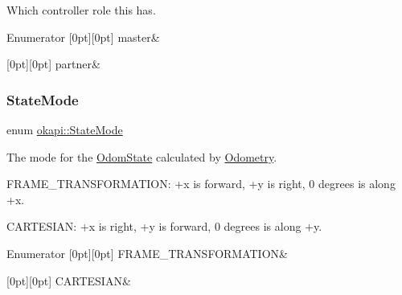 Which controller role this has. \begin{DoxyEnumFields}{Enumerator}
[0pt][0pt]{}\mbox{\label{namespaceokapi_a56349a0562b06c6ffc742e94cb1e4361aeb0a191797624dd3a48fa681d3061212}} 
master&\\
\hline

[0pt][0pt]{}\mbox{\label{namespaceokapi_a56349a0562b06c6ffc742e94cb1e4361a7454739e907f5595ae61d84b8547f574}} 
partner&\\
\hline

\end{DoxyEnumFields}
\mbox{\label{namespaceokapi_af37fbd761bd859a00ff4dd4a87dd8c07}} 
\subsubsection{\texorpdfstring{StateMode}{StateMode}}
{\footnotesize\ttfamily enum \mbox{\hyperlink{namespaceokapi_af37fbd761bd859a00ff4dd4a87dd8c07}{okapi\+::\+State\+Mode}}\hspace{0.3cm}{\ttfamily [strong]}}

The mode for the \mbox{\hyperlink{structokapi_1_1OdomState}{Odom\+State}} calculated by \mbox{\hyperlink{classokapi_1_1Odometry}{Odometry}}.

{\ttfamily F\+R\+A\+M\+E\+\_\+\+T\+R\+A\+N\+S\+F\+O\+R\+M\+A\+T\+I\+ON}\+: +x is forward, +y is right, 0 degrees is along +x.

{\ttfamily C\+A\+R\+T\+E\+S\+I\+AN}\+: +x is right, +y is forward, 0 degrees is along +y. \begin{DoxyEnumFields}{Enumerator}
[0pt][0pt]{}\mbox{\label{namespaceokapi_af37fbd761bd859a00ff4dd4a87dd8c07ad5ed7666e5cebf60d3af20a5a46edf3b}} 
F\+R\+A\+M\+E\+\_\+\+T\+R\+A\+N\+S\+F\+O\+R\+M\+A\+T\+I\+ON&\\
\hline

[0pt][0pt]{}\mbox{\label{namespaceokapi_af37fbd761bd859a00ff4dd4a87dd8c07ac02304094f2866a43251b12946a9a21b}} 
C\+A\+R\+T\+E\+S\+I\+AN&\\
\hline

\end{DoxyEnumFields}



